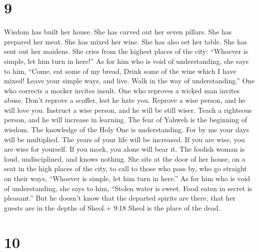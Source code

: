 \hypertarget{section-8}{%
\section{9}\label{section-8}}

 Wisdom has built her house. She has carved out her seven
pillars.  She has prepared her meat. She has mixed her wine.
She has also set her table.  She has sent out her maidens.
She cries from the highest places of the city:  ``Whoever is
simple, let him turn in here!'' As for him who is void of understanding,
she says to him,  ``Come, eat some of my bread, Drink some
of the wine which I have mixed!  Leave your simple ways, and
live. Walk in the way of understanding.''  One who corrects
a mocker invites insult. One who reproves a wicked man invites abuse.
 Don't reprove a scoffer, lest he hate you. Reprove a wise
person, and he will love you.  Instruct a wise person, and
he will be still wiser. Teach a righteous person, and he will increase
in learning.  The fear of Yahweh is the beginning of
wisdom. The knowledge of the Holy One is understanding. 
For by me your days will be multiplied. The years of your life will be
increased.  If you are wise, you are wise for yourself. If
you mock, you alone will bear it.  The foolish woman is
loud, undisciplined, and knows nothing.  She sits at the
door of her house, on a seat in the high places of the city,
 to call to those who pass by, who go straight on their
ways,  ``Whoever is simple, let him turn in here.'' As for
him who is void of understanding, she says to him, 
``Stolen water is sweet. Food eaten in secret is pleasant.''
 But he doesn't know that the departed spirits are there,
that her guests are in the depths of Sheol.+ 9:18 Sheol is the place of
the dead.

\hypertarget{section-9}{%
\section{10}\label{section-9}}

